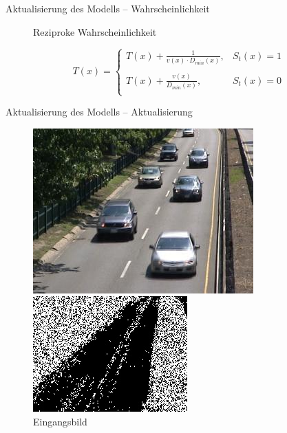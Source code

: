 \documentclass[hyperref={pdfpagelabels=false}]{beamer}
\begin{document}
\begin{frame}[t]{Aktualisierung des Modells -- Wahrscheinlichkeit}
\begin{figure}
\begin{minipage}{0.45\linewidth}
			\caption*{Reziproke Wahrscheinlichkeit}
		\end{minipage}
	\end{figure}
	\bigskip
	\begin{equation*}
		T(x)= 	\left\{
				\begin{array}{ll} 
					T(x) + \frac{1}{v(x)\cdot D_{min}(x)}, &  S_t(x) = 1 \\
					\\
					T(x) + \frac{v(x)}{D_{min}(x)}, &  S_t(x) = 0 \\
				\end{array}
			\right .
	\end{equation*}
\end{frame}

\begin{frame}[t]{Aktualisierung des Modells -- Aktualisierung}
	\vspace{1.65em}
	\begin{figure}
		\centering
		\begin{minipage}{0.45\linewidth}
			\includegraphics[width=1\linewidth]{Abbildungen/Eingang3.jpg}
			\caption*{Eingangsbild}
		\end{minipage}
		\begin{minipage}{0.45\linewidth}
			\includegraphics[width=1\linewidth]{Abbildungen/update_array.jpg}

\end{minipage}
\end{figure}
\end{frame}
\end{document}
